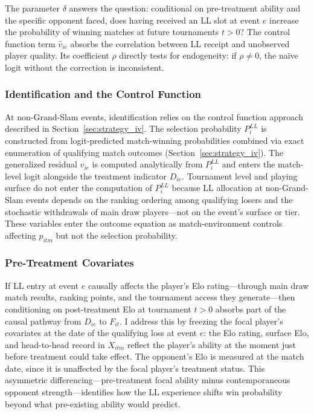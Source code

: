 The parameter $\delta$ answers the question: conditional on pre-treatment ability and the specific opponent faced, does having received an LL slot at event $e$ increase the probability of winning matches at future tournaments $t > 0$? The control function term $\hat{v}_{ie}$ absorbs the correlation between LL receipt and unobserved player quality. Its coefficient $\rho$ directly tests for endogeneity: if $\rho \neq 0$, the na\"ive logit without the correction is inconsistent.

\subsubsection{Identification and the Control Function}

At non-Grand-Slam events, identification relies on the control function approach described in Section~\ref{sec:strategy_iv}. The selection probability $P_i^{LL}$ is constructed from logit-predicted match-winning probabilities combined via exact enumeration of qualifying match outcomes (Section~\ref{sec:strategy_iv}). The generalized residual $\hat{v}_{ie}$ is computed analytically from $P_i^{LL}$ and enters the match-level logit alongside the treatment indicator $D_{ie}$. Tournament level and playing surface do not enter the computation of $P_i^{LL}$ because LL allocation at non-Grand-Slam events depends on the ranking ordering among qualifying losers and the stochastic withdrawals of main draw players---not on the event's surface or tier. These variables enter the outcome equation as match-environment controls affecting $p_{itm}$ but not the selection probability.

\subsubsection{Pre-Treatment Covariates}

If LL entry at event $e$ causally affects the player's Elo rating---through main draw match results, ranking points, and the tournament access they generate---then conditioning on post-treatment Elo at tournament $t > 0$ absorbs part of the causal pathway from $D_{ie}$ to $F_{it}$. I address this by freezing the focal player's covariates at the date of the qualifying loss at event $e$: the Elo rating, surface Elo, and head-to-head record in $X_{itm}$ reflect the player's ability at the moment just before treatment could take effect. The opponent's Elo is measured at the match date, since it is unaffected by the focal player's treatment status. This asymmetric differencing---pre-treatment focal ability minus contemporaneous opponent strength---identifies how the LL experience shifts win probability beyond what pre-existing ability would predict.

